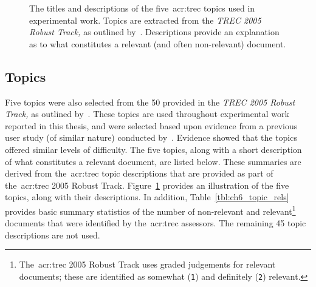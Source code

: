 \begin{figure}[t!]
    \centering
    \caption[TREC topic titles and descriptions]{The titles and descriptions of the five~\gls{acr:trec} topics used in experimental work. Topics are extracted from the \emph{TREC 2005 Robust Track,} as outlined by~\cite{voorhees2006trec_robust}. Descriptions provide an explanation as to what constitutes a relevant (and often non-relevant) document.}
    \label{fig:topics}
\end{figure}

\subsection{Topics}\label{sec:methodology:collection:topics}
Five topics were also selected from the 50 provided in the \emph{TREC 2005 Robust Track,} as outlined by~\cite{voorhees2006trec_robust}. These topics are used throughout experimental work reported in this thesis, and were selected based upon evidence from a previous user study (of similar nature) conducted by~\cite{kelly2009user_study}. Evidence showed that the topics offered similar levels of difficulty. The five topics, along with a short description of what constitutes a relevant document, are listed below. These summaries are derived from the~\gls{acr:trec} topic descriptions that are provided as part of the~\gls{acr:trec} 2005 Robust Track. Figure~\ref{fig:topics} provides an illustration of the five topics, along with their descriptions. In addition, Table~\ref{tbl:ch6_topic_rels} provides basic summary statistics of the number of non-relevant and relevant\footnote{The~\gls{acr:trec} 2005 Robust Track uses graded judgements for relevant documents; these are identified as somewhat (\texttt{1}) and definitely (\texttt{2}) relevant.} documents that were identified by the~\gls{acr:trec} assessors. The remaining 45 topic descriptions are not used.

